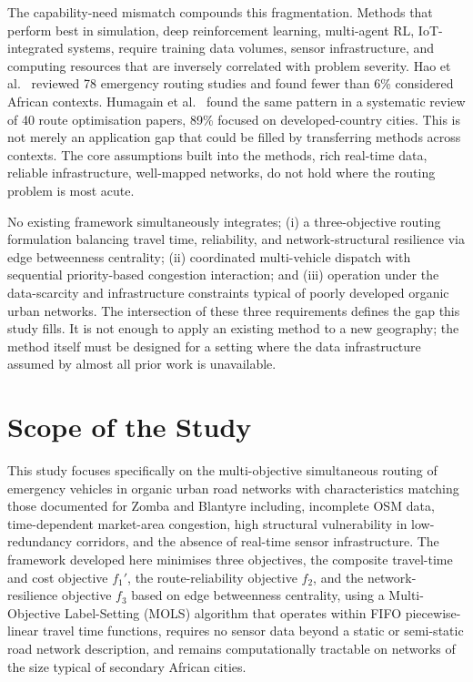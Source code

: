 \documentclass[paper=A4, 12pt, mathscr]{report}
\begin{document}
	The capability-need mismatch compounds this fragmentation. Methods that perform
	best in simulation, deep reinforcement learning, multi-agent RL,
	IoT-integrated systems, require training data volumes, sensor infrastructure,
	and computing resources that are inversely correlated with problem severity.
	Hao et al.\ \cite{hao2024} reviewed 78 emergency routing studies and found
	fewer than 6\% considered African contexts. Humagain et al.\ \cite{humagain2019}
	found the same pattern in a systematic review of 40 route optimisation
	papers, 89\% focused on developed-country cities. This is not merely an
	application gap that could be filled by transferring methods across contexts.
	The core assumptions built into the methods, rich real-time data, reliable
	infrastructure, well-mapped networks, do not hold where the routing problem
	is most acute.
	
	No existing framework simultaneously integrates; (i) a three-objective
	routing formulation balancing travel time, reliability, and network-structural
	resilience via edge betweenness centrality; (ii) coordinated multi-vehicle
	dispatch with sequential priority-based congestion interaction; and (iii)
	operation under the data-scarcity and infrastructure constraints typical of
	poorly developed organic urban networks. The intersection of these three
	requirements defines the gap this study fills. It is not enough to apply
	an existing method to a new geography; the method itself must be designed
	for a setting where the data infrastructure assumed by almost all prior
	work is unavailable.
	
	
	\section{Scope of the Study}
	\label{sec:lit_scope}
	
	This study focuses specifically on the multi-objective simultaneous routing
	of emergency vehicles in organic urban road networks with characteristics
	matching those documented for Zomba and Blantyre including, incomplete OSM data,
	time-dependent market-area congestion, high structural vulnerability in
	low-redundancy corridors, and the absence of real-time sensor infrastructure.
	The framework developed here minimises three objectives, the composite
	travel-time and cost objective $f_1'$, the route-reliability objective $f_2$,
	and the network-resilience objective $f_3$ based on edge betweenness
	centrality, using a Multi-Objective Label-Setting (MOLS) algorithm that
	operates within FIFO piecewise-linear travel time functions, requires no
	sensor data beyond a static or semi-static road network description, and
	remains computationally tractable on networks of the size typical of
	secondary African cities.
	
\end{document}
